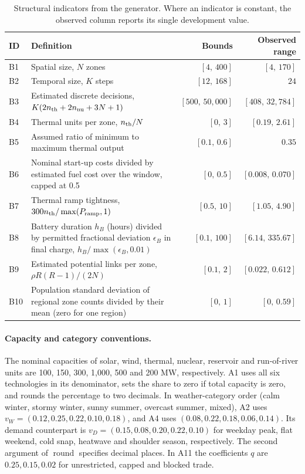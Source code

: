 \documentclass[11pt,a4paper]{article}
\newcommand{\rnd}{\operatorname{round}}
\newcommand{\tablefont}{\small\renewcommand{\arraystretch}{1.14}}
\begin{document}
\begin{table}[htbp]\centering\tablefont
\caption{Structural indicators from the generator. Where an indicator is constant, the observed column reports its single development value.}\label{tab:structural}
\begin{tabularx}{\linewidth}{@{}l L r r@{}}\toprule
ID & Definition & Bounds & Observed range\\\midrule
B1 & Spatial size, \(N\) zones & \([4,\,400]\) & \([4,\,170]\)\\
B2 & Temporal size, \(K\) steps & \([12,\,168]\) & \(24\)\\
B3 & Estimated discrete decisions, \(K(2n_{\rm th}+2n_{\rm nu}+3N+1)\) & \([500,\,50{,}000]\) & \([408,\,32{,}784]\)\\
B4 & Thermal units per zone, \(n_{\rm th}/N\) & \([0,\,3]\) & \([0.19,\,2.61]\)\\
B5 & Assumed ratio of minimum to maximum thermal output & \([0.1,\,0.6]\) & \(0.35\)\\
B6 & Nominal start-up costs divided by estimated fuel cost over the window, capped at 0.5 & \([0,\,0.5]\) & \([0.008,\,0.070]\)\\
B7 & Thermal ramp tightness, \(300n_{\rm th}/\max(P_{\rm ramp},1)\) & \([0.5,\,10]\) & \([1.05,\,4.90]\)\\
B8 & Battery duration \(h_B\) (hours) divided by permitted fractional deviation \(\epsilon_B\) in final charge, \(h_B/\max(\epsilon_B,0.01)\) & \([0.1,\,100]\) & \([6.14,\,335.67]\)\\
B9 & Estimated potential links per zone, \(\rho R(R-1)/(2N)\) & \([0.1,\,2]\) & \([0.022,\,0.612]\)\\
B10 & Population standard deviation of regional zone counts divided by their mean (zero for one region) & \([0,\,1]\) & \([0,\,0.59]\)\\
\bottomrule\end{tabularx}
\end{table}

\paragraph{Capacity and category conventions.}
The nominal capacities of solar, wind, thermal, nuclear, reservoir and run-of-river units are 100, 150, 300, 1,000, 500 and 200 MW, respectively. A1 uses all six technologies in its denominator, sets the share to zero if total capacity is zero, and rounds the percentage to two decimals. In weather-category order (calm winter, stormy winter, sunny summer, overcast summer, mixed), A2 uses \(v_W=(0.12,0.25,0.22,0.10,0.18)\), and A4 uses \((0.08,0.22,0.18,0.06,0.14)\). Its demand counterpart is \(v_D=(0.15,0.08,0.20,0.22,0.10)\) for weekday peak, flat weekend, cold snap, heatwave and shoulder season, respectively. The second argument of \(\rnd\) specifies decimal places. In A11 the coefficients \(q\) are \(0.25,0.15,0.02\) for unrestricted, capped and blocked trade.
\end{document}
